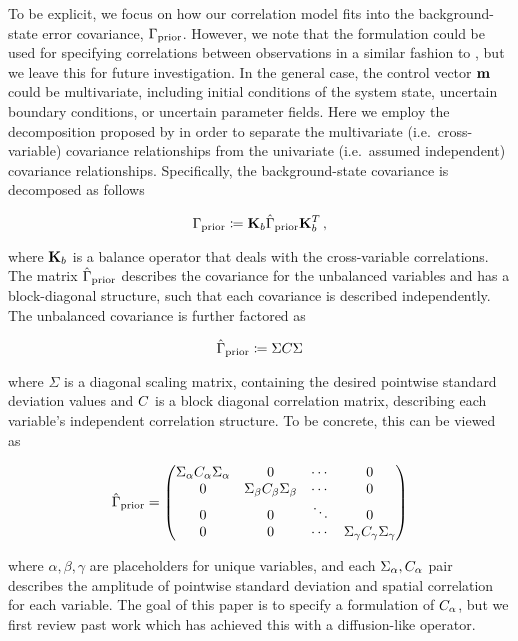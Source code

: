 To be explicit, we focus on how our correlation model fits into the
background-state error covariance, $\Gamma_{\text{prior}}$.
However, we note that the formulation could be used for specifying correlations
between observations in a similar fashion to \citet{guillet_modelling_2019}, but
we leave this for future investigation.
In the general case, the control vector $\mathbf{m}$ could be multivariate,
including initial conditions of the system state, uncertain boundary
conditions, or uncertain parameter fields.
Here we employ the decomposition proposed by
\citet{derber_reformulation_1999}
in order to separate the multivariate (i.e.\ cross-variable)
covariance relationships from the univariate (i.e.\ assumed
independent) covariance relationships.
Specifically, the background-state covariance is decomposed as follows
\begin{linenomath*}\begin{equation*}
    \Gamma_{\text{prior}} \coloneqq \mathbf{K}_{b}\hat{\Gamma}_\text{prior}\mathbf{K}_{b}^T \,
    ,
\end{equation*}\end{linenomath*}
where $\mathbf{K}_{b}$ is a balance operator that deals with the
cross-variable correlations.
The matrix $\hat{\Gamma}_\text{prior}$ describes the covariance for the unbalanced
variables and has a block-diagonal structure, such that each
covariance is described independently.
The unbalanced covariance is further factored as
\begin{linenomath*}\begin{equation*}
    \hat{\Gamma}_\text{prior} \coloneqq \Sigma C \Sigma
\end{equation*}\end{linenomath*}
where $\Sigma$ is a diagonal scaling matrix, containing the desired pointwise
standard deviation values and $C$ is a block diagonal correlation matrix,
describing each variable's independent correlation structure.
To be concrete, this can be viewed as
\begin{linenomath*}\begin{equation*}
    \hat{\Gamma}_\text{prior} =
    \begin{pmatrix}
        \Sigma_\alpha C_\alpha\Sigma_\alpha & 0 & \cdots & 0 \\
        0 & \Sigma_\beta C_\beta\Sigma_\beta & \cdots & 0 \\
        0 & 0 & \ddots & 0  \\
        0 & 0 & \cdots & \Sigma_\gamma C_\gamma\Sigma_\gamma \\
    \end{pmatrix}
\end{equation*}\end{linenomath*}
where $\alpha, \beta, \gamma$ are placeholders for unique variables, and each
$\Sigma_\alpha, C_\alpha$ pair describes the amplitude of pointwise standard deviation
and spatial correlation for each variable.
The goal of this paper is to specify a formulation of $C_\alpha$, but we
first review past work which has achieved this with a diffusion-like
operator.


